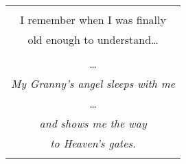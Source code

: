 \documentclass{article}
\begin{document}
\begin{center}
\begin{tabular}{c}
{%
\\
I remember when I was finally \\
old enough to understand\ldots{} \\
\\
\ldots{} \\
\textit{My Granny's angel sleeps with me} \\
\ldots{} \\
\textit{and shows me the way} \\
\textit{to Heaven's gates.} \\
\\
\end{tabular}
\end{center}
\vspace{3ex}
\end{document}

